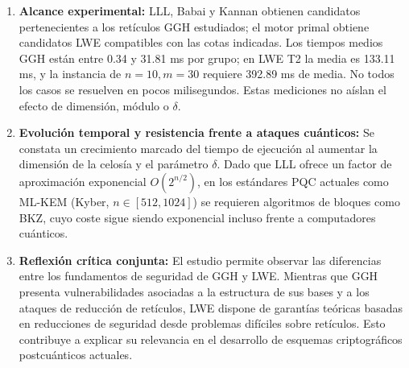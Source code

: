 \documentclass[12pt,a4paper]{article}
\begin{document}
\begin{enumerate}
    \item \textbf{Alcance experimental:} LLL, Babai y Kannan obtienen
    candidatos pertenecientes a los retículos GGH estudiados; el motor
    primal obtiene candidatos LWE compatibles con las cotas indicadas.
    Los tiempos medios GGH están entre 0.34 y 31.81 ms por grupo;
    en LWE T2 la media es 133.11 ms, y la instancia de $n=10,m=30$
    requiere 392.89 ms de media. No todos los casos se resuelven
    en pocos milisegundos. Estas mediciones no aíslan el efecto de
    dimensión, módulo o $\delta$.
    \item \textbf{Evolución temporal y resistencia frente a ataques cuánticos:} Se constata un crecimiento marcado del tiempo de ejecución al aumentar la dimensión de la celosía y el parámetro $\delta$. Dado que LLL ofrece un factor de aproximación exponencial $O(2^{n/2})$, en los estándares PQC actuales como ML-KEM \cite{nist2024} (Kyber, $n \in [512, 1024]$) se requieren algoritmos de bloques como BKZ, cuyo coste sigue siendo exponencial incluso frente a computadores cuánticos.
    \item \textbf{Reflexión crítica conjunta:} El estudio permite observar las diferencias entre los fundamentos de seguridad de GGH y LWE. Mientras que GGH presenta vulnerabilidades asociadas a la estructura de sus bases y a los ataques de reducción de retículos, LWE dispone de garantías teóricas basadas en reducciones de seguridad desde problemas difíciles sobre retículos. Esto contribuye a explicar su relevancia en el desarrollo de esquemas criptográficos postcuánticos actuales.
\end{enumerate}
\end{document}
